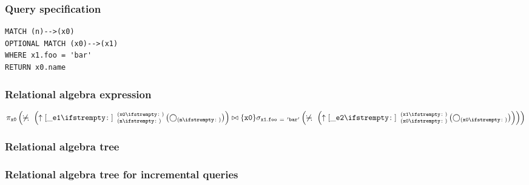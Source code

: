 \subsubsection*{Query specification}

\begin{lstlisting}
MATCH (n)-->(x0)
OPTIONAL MATCH (x0)-->(x1)
WHERE x1.foo = 'bar'
RETURN x0.name
\end{lstlisting}

\subsubsection*{Relational algebra expression}

$\projection{\var{x0}} \left(\alldifferent{} \left(\expandout{\_e1}{}{n}{x0}{} \left(\getvertices{n}{}\right)\right) \join \{\var{x0}\} \selection{\mathtt{x1.foo~=~'bar'}} \left(\alldifferent{} \left(\expandout{\_e2}{}{x0}{x1}{} \left(\getvertices{x0}{}\right)\right)\right)\right)$

\subsubsection*{Relational algebra tree}


\subsubsection*{Relational algebra tree for incremental queries}

